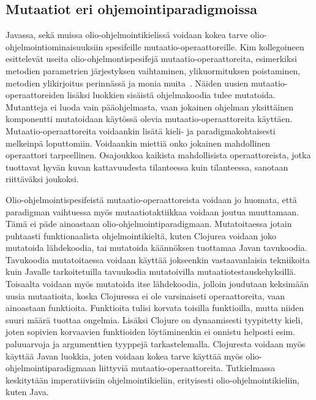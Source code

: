 \documentclass{tktltiki}
\begin{document}
\subsection{Mutaatiot eri ohjemointiparadigmoissa}
Javassa, sekä muissa olio-ohjelmointikielissä voidaan kokea tarve olio-ohjelmointiominaisuuksiin spesifeille mutaatio-operaattoreille. Kim kollegoineen esittelevät useita olio-ohjelmontispesifejä mutaatio-operaattoreita, esimerkiksi metodien parametrien järjestyksen vaihtaminen, ylikuormituksen poistaminen, metodien ylikirjoitus perinnässä ja monia muita~\cite{KimCM00}. Näiden uusien mutaatio-operaattoreiden lisäksi luokkien sisäistä ohjelmakoodia tulee mutatoida. Mutantteja ei luoda vain pääohjelmasta, vaan jokainen ohjelman yksittäinen komponentti mutatoidaan käytössä olevia mutaatio-operaattoreita käyttäen. Mutaatio-operaattoreita voidaankin lisätä kieli- ja paradigmakohtaisesti melkeinpä loputtomiin. Voidaankin miettiä onko jokainen mahdollinen operaattori tarpeellinen. Osajoukkoa kaikista mahdollisista operaattoreista, jotka tuottavat hyvän kuvan kattavuudesta tilanteessa kuin tilanteessa, sanotaan riittäväksi joukoksi.

Olio-ohjelmointispesifeistä mutaatio-operaattoreista voidaan jo huomata, että paradigman vaihtuessa myös mutaatiotaktiikkaa voidaan joutua muuttamaan. Tämä ei päde ainoastaan olio-ohjelmointiparadigmaan. Mutatoitaessa jotain puhtaasti funktionaalista ohjelmointikieltä, kuten Clojurea voidaan joko mutatoida lähdekoodia, tai mutatoida käännöksen tuottamaa Javan tavukoodia. Tavukoodia mutatoitaessa voidaan käyttää jokseenkin vastaavanlaisia tekniikoita kuin Javalle tarkoitetuilla tavuukodia mutatoivilla mutaatiotestauskehyksillä. Toisaalta voidaan myös mutatoida itse lähdekoodia, jolloin joudutaan keksimään uusia mutaatioita, koska Clojuressa ei ole varsinaiseti operaattoreita, vaan ainoastaan funktioita. Funktioita tulisi korvata toisilla funktioilla, mutta niiden suuri määrä tuottaa ongelmia. Lisäksi Clojure on dynaamisesti tyypitetty kieli, joten sopivien korvaavien funktioiden löytäminenkin ei onnistu helposti esim. paluuarvoja ja argumenttien tyyppejä tarkastelemalla. Clojuresta voidaan myös käyttää Javan luokkia, joten voidaan kokea tarve käyttää myös olio-ohjelmointiparadigmaan liittyviä mutaatio-operaattoreita. Tutkielmassa keskitytään imperatiivisiin ohjelmointikieliin, erityisesti olio-ohjelmointikieliin, kuten Java.
\end{document}
